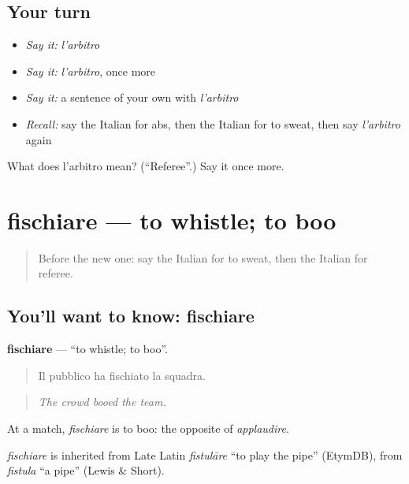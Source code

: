 \subsection*{Your turn}
\begin{itemize}
\raggedright
  \item \emph{Say it:} \emph{l'arbitro}
  \item \emph{Say it:} \emph{l'arbitro}, once more
  \item \emph{Say it:} a sentence of your own with \emph{l'arbitro}
  \item \emph{Recall:} say the Italian for abs, then the Italian for to sweat, then say \emph{l'arbitro} again
\end{itemize}

\begin{tcolorbox}[breakable,colback=teal!4,colframe=teal!35!black,title={Before you move on}]
What does l'arbitro mean? (\textquotedblleft{}Referee\textquotedblright{}.) Say it once more.
\end{tcolorbox}
\section[fischiare]{fischiare — to whistle; to boo}

\label{lesson:IT-C509-fischiare}



\begin{quote}
Before the new one: say the Italian for to sweat, then the Italian for referee.
\end{quote}

\subsection*{You'll want to know: fischiare}
\textbf{fischiare} — \textquotedblleft{}to whistle; to boo\textquotedblright{}.

\begin{quote}
Il pubblico ha fischiato la squadra.
\end{quote}

\begin{quote}
\emph{The crowd booed the team.}
\end{quote}

At a match, \emph{fischiare} is to boo: the opposite of \emph{applaudire}.

\begin{cousinweb}
\emph{fischiare} is inherited from Late Latin \emph{fistulāre} \textquotedblleft{}to play the pipe\textquotedblright{} (EtymDB), from \emph{fistula} \textquotedblleft{}a pipe\textquotedblright{} (Lewis \& Short).
\end{cousinweb}

